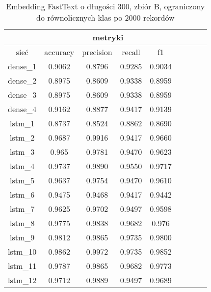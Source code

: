 \begin{table}[p]  \centering
    \caption{Embedding FastText o długości 300, zbiór B, ograniczony do \label{tab:wyniki_fasttext_B_lim}
        równolicznych klas po 2000 rekordów}
    \begin{tabular} {|c|c|c|c|c|c|c|c|c| }    \hline
                 & \multicolumn{4}{c|}{metryki}                               \\ \hline
        sieć     & accuracy                     & precision & recall & f1     \\ \hline
        dense\_1 & 0.9062                       & 0.8796    & 0.9285 & 0.9034 \\ \hline
        dense\_2 & 0.8975                       & 0.8609    & 0.9338 & 0.8959 \\ \hline
        dense\_3 & 0.8975                       & 0.8609    & 0.9338 & 0.8959 \\ \hline
        dense\_4 & 0.9162                       & 0.8877    & 0.9417 & 0.9139 \\ \hline
        lstm\_1  & 0.8737                       & 0.8524    & 0.8862 & 0.8690 \\ \hline
        lstm\_2  & 0.9687                       & 0.9916    & 0.9417 & 0.9660 \\ \hline
        lstm\_3  & 0.965                        & 0.9781    & 0.9470 & 0.9623 \\ \hline
        lstm\_4  & 0.9737                       & 0.9890    & 0.9550 & 0.9717 \\ \hline
        lstm\_5  & 0.9637                       & 0.9754    & 0.9470 & 0.9610 \\ \hline
        lstm\_6  & 0.9475                       & 0.9468    & 0.9417 & 0.9442 \\ \hline
        lstm\_7  & 0.9625                       & 0.9702    & 0.9497 & 0.9598 \\ \hline
        lstm\_8  & 0.9775                       & 0.9838    & 0.9682 & 0.976  \\ \hline
        lstm\_9  & 0.9812                       & 0.9865    & 0.9735 & 0.9800 \\ \hline
        lstm\_10 & 0.9862                       & 0.9972    & 0.9735 & 0.9852 \\ \hline
        lstm\_11 & 0.9787                       & 0.9865    & 0.9682 & 0.9773 \\ \hline
        lstm\_12 & 0.9712                       & 0.9889    & 0.9497 & 0.9689 \\ \hline

\end{tabular}
\end{table}
